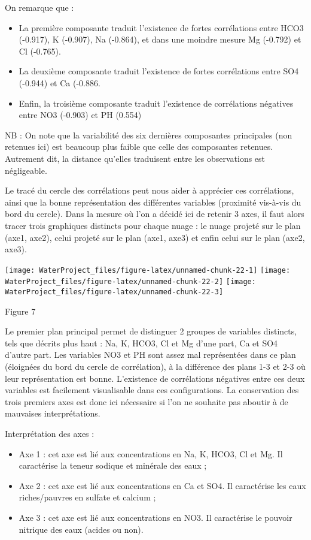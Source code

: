 \documentclass[]{article}
\providecommand{\tightlist}{%
  \setlength{\itemsep}{0pt}\setlength{\parskip}{0pt}}
\begin{document}
On remarque que :

\begin{itemize}
\tightlist
\item
  La première composante traduit l'existence de fortes corrélations
  entre HCO3 (-0.917), K (-0.907), Na (-0.864), et dans une moindre
  mesure Mg (-0.792) et Cl (-0.765).
\item
  La deuxième composante traduit l'existence de fortes corrélations
  entre SO4 (-0.944) et Ca (-0.886.
\item
  Enfin, la troisième composante traduit l'existence de corrélations
  négatives entre NO3 (-0.903) et PH (0.554)
\end{itemize}

NB : On note que la variabilité des six dernières composantes
principales (non retenues ici) est beaucoup plus faible que celle des
composantes retenues. Autrement dit, la distance qu'elles traduisent
entre les observations est négligeable.

Le tracé du cercle des corrélations peut nous aider à apprécier ces
corrélations, ainsi que la bonne représentation des différentes
variables (proximité vis-à-vis du bord du cercle). Dans la mesure où
l'on a décidé ici de retenir 3 axes, il faut alors tracer trois
graphiques distincts pour chaque nuage : le nuage projeté sur le plan
(axe1, axe2), celui projeté sur le plan (axe1, axe3) et enfin celui sur
le plan (axe2, axe3).

\texttt{[image: WaterProject\_files/figure-latex/unnamed-chunk-22-1]}
\texttt{[image: WaterProject\_files/figure-latex/unnamed-chunk-22-2]}
\texttt{[image: WaterProject\_files/figure-latex/unnamed-chunk-22-3]}

Figure 7

Le premier plan principal permet de distinguer 2 groupes de variables
distincts, tels que décrits plus haut : Na, K, HCO3, Cl et Mg d'une
part, Ca et SO4 d'autre part. Les variables NO3 et PH sont assez mal
représentées dans ce plan (éloignées du bord du cercle de corrélation),
à la différence des plans 1-3 et 2-3 où leur représentation est bonne.
L'existence de corrélations négatives entre ces deux variables est
facilement visualisable dans ces configurations. La conservation des
trois premiers axes est donc ici nécessaire si l'on ne souhaite pas
aboutir à de mauvaises interprétations.

Interprétation des axes :

\begin{itemize}
\tightlist
\item
  Axe 1 : cet axe est lié aux concentrations en Na, K, HCO3, Cl et Mg.
  Il caractérise la teneur sodique et minérale des eaux ;
\item
  Axe 2 : cet axe est lié aux concentrations en Ca et SO4. Il
  caractérise les eaux riches/pauvres en sulfate et calcium ;
\item
  Axe 3 : cet axe est lié aux concentrations en NO3. Il caractérise le
  pouvoir nitrique des eaux (acides ou non).
\end{itemize}
\end{document}
